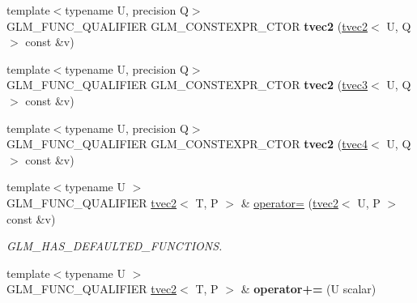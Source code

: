 \begin{DoxyCompactItemize}
{\footnotesize template$<$typename U, precision Q$>$ }\\G\+L\+M\+\_\+\+F\+U\+N\+C\+\_\+\+Q\+U\+A\+L\+I\+F\+I\+ER G\+L\+M\+\_\+\+C\+O\+N\+S\+T\+E\+X\+P\+R\+\_\+\+C\+T\+OR {\bfseries tvec2} (\hyperlink{structglm_1_1tvec2}{tvec2}$<$ U, Q $>$ const \&v)
\item 
\mbox{\label{structglm_1_1tvec2_a3912fabf45f663470f74776ed1c32c15}} 
{\footnotesize template$<$typename U, precision Q$>$ }\\G\+L\+M\+\_\+\+F\+U\+N\+C\+\_\+\+Q\+U\+A\+L\+I\+F\+I\+ER G\+L\+M\+\_\+\+C\+O\+N\+S\+T\+E\+X\+P\+R\+\_\+\+C\+T\+OR {\bfseries tvec2} (\hyperlink{structglm_1_1tvec3}{tvec3}$<$ U, Q $>$ const \&v)
\item 
\mbox{\label{structglm_1_1tvec2_a5837d885dadb1fdca54974c65166a8b4}} 
{\footnotesize template$<$typename U, precision Q$>$ }\\G\+L\+M\+\_\+\+F\+U\+N\+C\+\_\+\+Q\+U\+A\+L\+I\+F\+I\+ER G\+L\+M\+\_\+\+C\+O\+N\+S\+T\+E\+X\+P\+R\+\_\+\+C\+T\+OR {\bfseries tvec2} (\hyperlink{structglm_1_1tvec4}{tvec4}$<$ U, Q $>$ const \&v)
\item 
\mbox{\label{structglm_1_1tvec2_af214e66acab4db6f5a539ff9a161e3ba}} 
{\footnotesize template$<$typename U $>$ }\\G\+L\+M\+\_\+\+F\+U\+N\+C\+\_\+\+Q\+U\+A\+L\+I\+F\+I\+ER \hyperlink{structglm_1_1tvec2}{tvec2}$<$ T, P $>$ \& \hyperlink{structglm_1_1tvec2_af214e66acab4db6f5a539ff9a161e3ba}{operator=} (\hyperlink{structglm_1_1tvec2}{tvec2}$<$ U, P $>$ const \&v)
\begin{DoxyCompactList}\small\item\em G\+L\+M\+\_\+\+H\+A\+S\+\_\+\+D\+E\+F\+A\+U\+L\+T\+E\+D\+\_\+\+F\+U\+N\+C\+T\+I\+O\+NS. \end{DoxyCompactList}\item 
\mbox{\label{structglm_1_1tvec2_a6c7476ec32ff4f21ace471d326a9be06}} 
{\footnotesize template$<$typename U $>$ }\\G\+L\+M\+\_\+\+F\+U\+N\+C\+\_\+\+Q\+U\+A\+L\+I\+F\+I\+ER \hyperlink{structglm_1_1tvec2}{tvec2}$<$ T, P $>$ \& {\bfseries operator+=} (U scalar)
\item 
\mbox{\label{structglm_1_1tvec2_a977134a069d9e6fec28d33204ed68019}} 

\end{DoxyCompactItemize}
